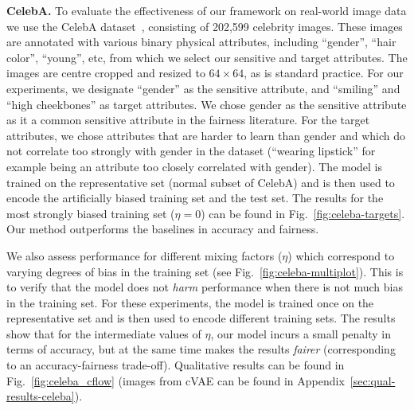 \textbf{CelebA.}
To evaluate the effectiveness of our framework on real-world image data we use the CelebA dataset~\cite{liu2015faceattributes}, consisting of 202,599 celebrity images.
These images are annotated with various binary physical  attributes, including ``gender'', ``hair color'', ``young'', etc, from which we  select our sensitive and target attributes.
The images are centre cropped and resized to $64\times64$, as is standard practice.
For our experiments, we designate ``gender'' as the sensitive attribute,
and ``smiling'' and ``high cheekbones'' as target attributes.
We chose gender as the sensitive attribute as it a common sensitive attribute in the fairness literature.
For the target attributes, we chose attributes that are harder to learn than gender and which do not correlate too strongly with gender in the dataset
(``wearing lipstick'' for example being an attribute too closely correlated with gender).
The model is trained on the representative set (normal subset of CelebA)
and is then used to encode the artificially biased training set and the test set.
The results for the most strongly biased training set ($\eta=0$) can be found in Fig.~\ref{fig:celeba-targets}.
Our method outperforms the baselines in accuracy and fairness.

We also assess performance for different mixing factors ($\eta$) which correspond to varying degrees of bias in the training set
(see Fig.~\ref{fig:celeba-multiplot}).
This is to verify that the model does not \emph{harm} performance when there is not much bias in the training set.
For these experiments, the model is trained once on the representative set and is then used to encode different training sets.
The results show that for the intermediate values of $\eta$, our model incurs a small penalty in terms of accuracy,
but at the same time makes the results \emph{fairer} (corresponding to an accuracy-fairness trade-off). Qualitative results can be found in Fig.~\ref{fig:celeba_cflow} (images from cVAE can be found in Appendix~\ref{sec:qual-results-celeba}).

